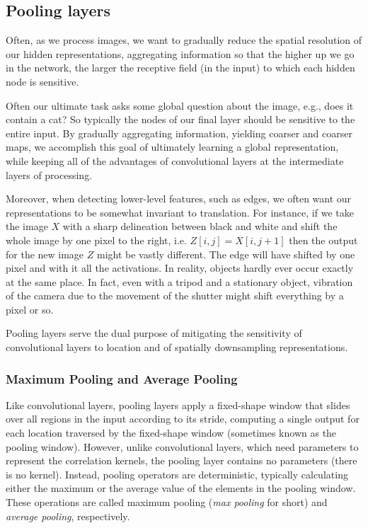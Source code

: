 \subsection{Pooling layers}\label{subsec:pool_layers}

Often, as we process images, we want to gradually reduce the spatial resolution of our hidden representations, aggregating information so that the higher up we go in the network, the larger the receptive field (in the input) to which each hidden node is sensitive.

Often our ultimate task asks some global question about the image, e.g., does it contain a cat? So typically the nodes of our final layer should be sensitive to the entire input. By gradually aggregating information, yielding coarser and coarser maps, we accomplish this goal of ultimately learning a global representation, while keeping all of the advantages of convolutional layers at the intermediate layers of processing.

Moreover, when detecting lower-level features, such as edges, we often want our representations to be somewhat invariant to translation. For instance, if we take the image $X$ with a sharp delineation between black and white and shift the whole image by one pixel to the right, i.e. $Z[i,j] = X[i,j+1]$ then the output for the new image $Z$ might be vastly different. The edge will have shifted by one pixel and with it all the activations. In reality, objects hardly ever occur exactly at the same place. In fact, even with a tripod and a stationary object, vibration of the camera due to the movement of the shutter might shift everything by a pixel or so.

Pooling layers serve the dual purpose of mitigating the sensitivity of convolutional layers to location and of spatially downsampling representations.

\subsubsection{Maximum Pooling and Average Pooling}

Like convolutional layers, pooling layers apply a fixed-shape window that slides over all regions in the input according to its stride, computing a single output for each location traversed by the fixed-shape window (sometimes known as the pooling window). However, unlike convolutional layers, which need parameters to represent the correlation kernels, the pooling layer contains no parameters (there is no kernel). Instead, pooling operators are deterministic, typically calculating either the maximum or the average value of the elements in the pooling window. These operations are called maximum pooling (\textit{max pooling} for short) and \textit{average pooling}, respectively.

